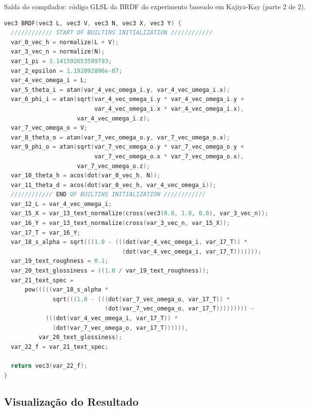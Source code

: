 \begin{codigo}[H]
    \caption{\small Saída do compilador: código GLSL da BRDF do experimento baseado em Kajiya-Kay (parte 2 de 2).}
    \label{cod-kajiya-glsl-pt-2}
\begin{lstlisting}[language=C, inputencoding=utf8]
vec3 BRDF(vec3 L, vec3 V, vec3 N, vec3 X, vec3 Y) {
  //////////// START OF BUILTINS INITIALIZATION ////////////
  var_0_vec_h = normalize(L + V);
  var_3_vec_n = normalize(N);
  var_1_pi = 3.141592653589793;
  var_2_epsilon = 1.192092896e-07;
  var_4_vec_omega_i = L;
  var_5_theta_i = atan(var_4_vec_omega_i.y, var_4_vec_omega_i.x);
  var_6_phi_i = atan(sqrt(var_4_vec_omega_i.y * var_4_vec_omega_i.y +
                          var_4_vec_omega_i.x * var_4_vec_omega_i.x),
                     var_4_vec_omega_i.z);
  var_7_vec_omega_o = V;
  var_8_theta_o = atan(var_7_vec_omega_o.y, var_7_vec_omega_o.x);
  var_9_phi_o = atan(sqrt(var_7_vec_omega_o.y * var_7_vec_omega_o.y +
                          var_7_vec_omega_o.x * var_7_vec_omega_o.x),
                     var_7_vec_omega_o.z);
  var_10_theta_h = acos(dot(var_0_vec_h, N));
  var_11_theta_d = acos(dot(var_0_vec_h, var_4_vec_omega_i));
  //////////// END OF BUILTINS INITIALIZATION ////////////
  var_12_L = var_4_vec_omega_i;
  var_15_X = var_13_text_normalize(cross(vec3(0.0, 1.0, 0.0), var_3_vec_n));
  var_16_Y = var_13_text_normalize(cross(var_3_vec_n, var_15_X));
  var_17_T = var_16_Y;
  var_18_s_alpha = sqrt(((1.0 - (((dot(var_4_vec_omega_i, var_17_T)) *
                                  (dot(var_4_vec_omega_i, var_17_T)))))));
  var_19_text_roughness = 0.1;
  var_20_text_glossiness = ((1.0 / var_19_text_roughness));
  var_21_text_spec =
      pow(((((var_18_s_alpha *
              sqrt(((1.0 - (((dot(var_7_vec_omega_o, var_17_T)) *
                             (dot(var_7_vec_omega_o, var_17_T))))))))) -
            (((dot(var_4_vec_omega_i, var_17_T)) *
              (dot(var_7_vec_omega_o, var_17_T)))))),
          var_20_text_glossiness);
  var_22_f = var_21_text_spec;

  return vec3(var_22_f);
}


\end{lstlisting}
\end{codigo}

\subsection{Visualização do Resultado}

